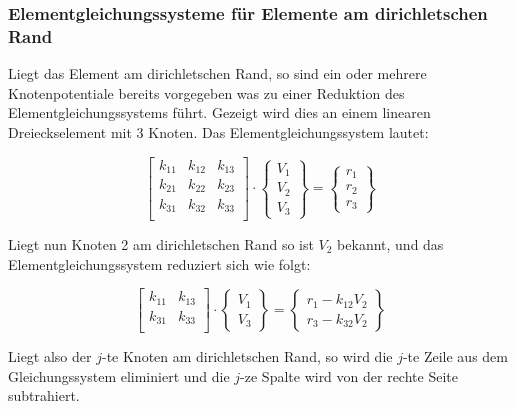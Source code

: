 \subsubsection{Elementgleichungssysteme für Elemente am dirichletschen Rand}
Liegt das Element am dirichletschen Rand, so sind ein oder mehrere Knotenpotentiale bereits vorgegeben was zu einer Reduktion des Elementgleichungssystems führt. Gezeigt wird dies an einem linearen Dreieckselement mit 3 Knoten. Das Elementgleichungssystem lautet:

\begin{equation}
\begin{bmatrix}
k_{11} & k_{12} & k_{13} \\
k_{21} & k_{22} & k_{23} \\
k_{31} & k_{32} & k_{33} \\
\end{bmatrix} \cdot 
\begin{Bmatrix}
V_1 \\
V_2 \\
V_3
\end{Bmatrix} = 
\begin{Bmatrix}
r_1 \\
r_2 \\
r_3
\end{Bmatrix}
\end{equation}

Liegt nun Knoten 2 am dirichletschen Rand so ist $V_2$ bekannt, und das Elementgleichungssystem reduziert sich wie folgt:

\begin{equation}
\begin{bmatrix}
k_{11}  & k_{13} \\
k_{31}  & k_{33} \\
\end{bmatrix} \cdot 
\begin{Bmatrix}
V_1 \\
V_3
\end{Bmatrix} = 
\begin{Bmatrix}
r_1 - k_{12} V_2 \\
r_3 - k_{32} V_2
\end{Bmatrix}
\end{equation}

Liegt also der $j$-te Knoten am dirichletschen Rand, so wird die $j$-te Zeile aus dem Gleichungssystem eliminiert und die $j$-ze Spalte wird von der rechte Seite subtrahiert.


